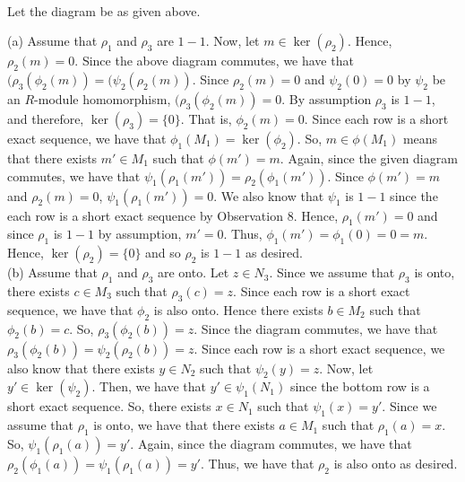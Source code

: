 \begin{solution}\renewcommand{\qedsymbol}{}\ \\
    Let the diagram be as given above.

    (a) Assume that $\rho_1$ and $\rho_3$ are $1-1$. Now, let $m\in\ker(\rho_2)$. Hence, $\rho_2(m)=0$.
    Since the above diagram commutes, we have that $(\rho_3(\phi_2(m))=(\psi_2(\rho_2(m))$. Since
    $\rho_2(m)=0$ and $\psi_2(0)=0$ by $\psi_2$ be an $R$-module homomorphism, $(\rho_3(\phi_2(m))=0$.
    By assumption $\rho_3$ is $1-1$, and therefore, $\ker(\rho_3)=\{0\}$. That is, $\phi_2(m)=0$. Since
    each row is a short exact sequence, we have that $\phi_1(M_1)=\ker(\phi_2)$. So, $m\in\phi(M_1)$
    means that there exists $m'\in M_1$ such that $\phi(m')=m$. Again, since the given diagram commutes,
    we have that $\psi_1(\rho_1(m'))=\rho_2(\phi_1(m'))$. Since $\phi(m')=m$ and $\rho_2(m)=0$,
    $\psi_1(\rho_1(m'))=0$. We also know that $\psi_1$ is $1-1$ since the each row is a short exact
    sequence by Observation 8. Hence, $\rho_1(m')=0$ and since $\rho_1$ is $1-1$ by assumption, $m'=0$.
    Thus, $\phi_1(m')=\phi_1(0)=0=m$. Hence, $\ker(\rho_2)=\{0\}$ and so $\rho_2$ is $1-1$ as desired.\\

    (b) Assume that $\rho_1$ and $\rho_3$ are onto. Let $z\in N_3$. Since we assume that $\rho_3$ is
    onto, there exists $c\in M_3$ such that $\rho_3(c)=z$. Since each row is a short exact sequence, we
    have that $\phi_2$ is also onto. Hence there exists $b\in M_2$ such that $\phi_2(b)=c$. So,
    $\rho_3(\phi_2(b))=z$. Since the diagram commutes, we have that
    $\rho_3(\phi_2(b))=\psi_2(\rho_2(b))=z$. Since each row is a short exact sequence, we also know that
    there exists $y\in N_2$ such that $\psi_2(y)=z$. Now, let $y'\in\ker(\psi_2)$. Then, we have that
    $y'\in\psi_1(N_1)$ since the bottom row is a short exact sequence. So, there exists $x\in N_1$ such
    that $\psi_1(x)=y'$. Since we assume that $\rho_1$ is onto, we have that there exists $a\in M_1$
    such that $\rho_1(a)=x$. So, $\psi_1(\rho_1(a))=y'$. Again, since the diagram commutes, we have that
    $\rho_2(\phi_1(a))=\psi_1(\rho_1(a))=y'$. Thus, we have that $\rho_2$ is also onto as desired.


\end{solution}